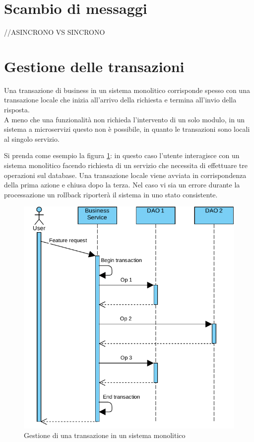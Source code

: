 \section{Scambio di messaggi}
//ASINCRONO VS SINCRONO

\section{Gestione delle transazioni}
Una transazione di business in un sistema monolitico corrisponde spesso con una transazione locale che inizia all'arrivo della richiesta e termina all'invio della risposta.\\
A meno che una funzionalità non richieda l'intervento di un solo modulo, in un sistema a microservizi questo non è possibile, in quanto le transazioni sono locali al singolo servizio.

Si prenda come esempio la figura \ref{fig:mono-transaction}: in questo caso l'utente interagisce con un sistema monolitico facendo richiesta di un servizio che necessita di effettuare tre operazioni sul database.
Una transazione locale viene avviata in corrispondenza della prima azione e chiusa dopo la terza.
Nel caso vi sia un errore durante la processazione un rollback riporterà il sistema in uno stato consistente.

\begin{figure}[h]
	\centering
	\includegraphics[width=\textwidth]{img/monolithic-transaction}
	\caption{Gestione di una transazione in un sistema monolitico}
	\label{fig:mono-transaction}
\end{figure}

